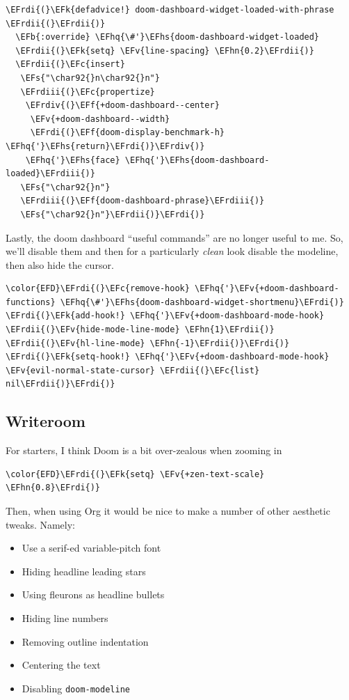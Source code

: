 \documentclass{scrartcl}
\newcommand{\EFk}[1]{\textcolor{EFk}{#1}} %
\newcommand{\EFs}[1]{\textcolor{EFs}{#1}} %
\newcommand{\EFb}[1]{\textcolor{EFb}{#1}} %
\newcommand{\EFc}[1]{\textcolor{EFc}{#1}} %
\newcommand{\EFv}[1]{\textcolor{EFv}{#1}} %
\newcommand{\EFf}[1]{\textcolor{EFf}{#1}} %
\newcommand{\EFhn}[1]{#1} %
\newcommand{\EFhq}[1]{#1} %
\newcommand{\EFhs}[1]{#1} %
\newcommand{\EFrdi}[1]{#1} %
\newcommand{\EFrdii}[1]{#1} %
\newcommand{\EFrdiii}[1]{#1} %
\newcommand{\EFrdiv}[1]{#1} %
\begin{document}
\begin{Code}
\begin{Verbatim}[]
\EFrdi{(}\EFk{defadvice!} doom-dashboard-widget-loaded-with-phrase \EFrdii{(}\EFrdii{)}
  \EFb{:override} \EFhq{\#'}\EFhs{doom-dashboard-widget-loaded}
  \EFrdii{(}\EFk{setq} \EFv{line-spacing} \EFhn{0.2}\EFrdii{)}
  \EFrdii{(}\EFc{insert}
   \EFs{"\char92{}n\char92{}n"}
   \EFrdiii{(}\EFc{propertize}
    \EFrdiv{(}\EFf{+doom-dashboard--center}
     \EFv{+doom-dashboard--width}
     \EFrdi{(}\EFf{doom-display-benchmark-h} \EFhq{'}\EFhs{return}\EFrdi{)}\EFrdiv{)}
    \EFhq{'}\EFhs{face} \EFhq{'}\EFhs{doom-dashboard-loaded}\EFrdiii{)}
   \EFs{"\char92{}n"}
   \EFrdiii{(}\EFf{doom-dashboard-phrase}\EFrdiii{)}
   \EFs{"\char92{}n"}\EFrdii{)}\EFrdi{)}
\end{Verbatim}
\end{Code}

Lastly, the doom dashboard ``useful commands'' are no longer useful to me. So, we'll disable them and then for a particularly \emph{clean} look disable the modeline, then also hide the cursor.
\begin{Code}
\begin{Verbatim}[]
\color{EFD}\EFrdi{(}\EFc{remove-hook} \EFhq{'}\EFv{+doom-dashboard-functions} \EFhq{\#'}\EFhs{doom-dashboard-widget-shortmenu}\EFrdi{)}
\EFrdi{(}\EFk{add-hook!} \EFhq{'}\EFv{+doom-dashboard-mode-hook} \EFrdii{(}\EFv{hide-mode-line-mode} \EFhn{1}\EFrdii{)} \EFrdii{(}\EFv{hl-line-mode} \EFhn{-1}\EFrdii{)}\EFrdi{)}
\EFrdi{(}\EFk{setq-hook!} \EFhq{'}\EFv{+doom-dashboard-mode-hook} \EFv{evil-normal-state-cursor} \EFrdii{(}\EFc{list} nil\EFrdii{)}\EFrdi{)}
\end{Verbatim}
\end{Code}

\subsection{Writeroom}
\label{sec:org617baf2}
For starters, I think Doom is a bit over-zealous when zooming in
\begin{Code}
\begin{Verbatim}[]
\color{EFD}\EFrdi{(}\EFk{setq} \EFv{+zen-text-scale} \EFhn{0.8}\EFrdi{)}
\end{Verbatim}
\end{Code}

Then, when using Org it would be nice to make a number of other aesthetic
tweaks. Namely:
\begin{itemize}
\item Use a serif-ed variable-pitch font
\item Hiding headline leading stars
\item Using fleurons as headline bullets
\item Hiding line numbers
\item Removing outline indentation
\item Centering the text
\item Disabling \texttt{doom-modeline}
\end{itemize}
\end{document}
